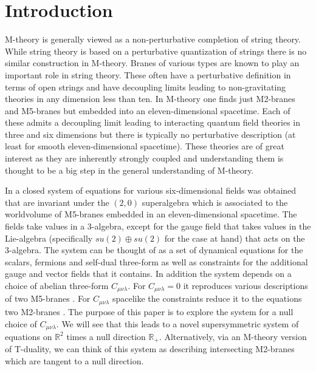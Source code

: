 \documentclass[12pt]{article}
\numberwithin{equation}{section}
\begin{document}
 
\newpage 
 
\renewcommand{\thefootnote}{\arabic{footnote}}
\setcounter{footnote}{0} 

\section{Introduction}

M-theory is generally viewed as a non-perturbative completion of string theory. While string theory is based on a perturbative quantization of strings there is no similar construction in M-theory. Branes of various types are known to play an important role in string theory. These often have a perturbative definition in terms of open strings and have decoupling limits leading to non-gravitating theories in any dimension less than ten. In M-theory one finds just M2-branes and M5-branes but embedded into an eleven-dimensional spacetime. Each of these admits a decoupling limit leading to interacting quantum field theories in three and six dimensions but there is typically no perturbative description (at least for smooth eleven-dimensional spacetime). These theories are of great interest as they are inherently strongly coupled and understanding them is thought to be a big step in the general understanding of M-theory. 

In  \cite{Lambert:2010wm,Lambert:2016xbs} a closed system of equations for various six-dimensional fields was obtained that are invariant under the $(2,0)$ superalgebra which is associated to the worldvolume of M5-branes embedded in an eleven-dimensional spacetime. The fields take values in a 3-algebra, except for the gauge field that takes values in the Lie-algebra (specifically $su(2)\oplus su(2)$ for the case at hand) that acts on the 3-algebra. The system can be thought of as a set of dynamical equations for the scalars, fermions and self-dual three-form as well as constraints for the additional gauge  and   vector fields that it contains. In addition the system depends on a choice of abelian three-form $C_{\mu\nu\lambda}$. For $C_{\mu\nu\lambda}=0$ it reproduces various descriptions of two M5-branes \cite{Lambert:2010wm,Lambert:2011gb,Hull:2014cxa}. For $C_{\mu\nu\lambda}$ spacelike the constraints reduce it to the equations two M2-branes \cite{Lambert:2016xbs}. 
The purpose of this paper is to explore the system for a null choice of  $C_{\mu\nu\lambda}$. We will see that this leads to a novel supersymmetric system of equations on ${\mathbb R}^2$ times a null direction ${\mathbb R}_+$. Alternatively, via an M-theory version of T-duality, we can think of this system as describing intersecting M2-branes which are tangent to a null direction.
\end{document}
